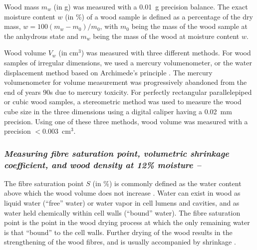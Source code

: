 \documentclass[a4paper, 12pt, leqno, dvipsnames]{article}\usepackage[]{graphicx}\usepackage[]{color}
\begin{document}
Wood mass $m_w$ (in g) was measured with a 0.01~g precision balance. The exact moisture content $w$ (in \%) of a wood sample is defined as a percentage of the dry mass, $w=100(m_w-m_0)/m_0$, with $m_0$ being the mass of the wood sample at the anhydrous state and $m_w$ being the mass of the wood at moisture content $w$. 

Wood volume $V_w$ (in cm$^3$) was measured with three different methods. For wood samples of irregular dimensions, we used a mercury volumenometer, or the water displacement method based on Archimede's principle \citep{Williamson2010}. The mercury volumenometer for volume measurement was progressively abandoned from the end of years 90s due to mercury toxicity. For perfectly rectangular parallelepiped or cubic wood samples, a stereometric method was used to measure the wood cube size in the three dimensions using a digital caliper having a 0.02~mm precision. Using one of these three methods, wood volume was measured with a precision $<$0.003~cm$^3$.

\subsubsection*{\textnormal{\textit{Measuring fibre saturation point, volumetric shrinkage coefficient, and wood density at 12\% moisture --}}}

The fibre saturation point $S$ (in \%) is commonly defined as the water content above which the wood volume does not increase \citep{Skaar1988}. Water can exist in wood as liquid water (``free'' water) or water vapor in cell lumens and cavities, and as water held chemically within cell walls (``bound'' water). The fibre saturation point is the point in the wood drying process at which the only remaining water is that ``bound'' to the cell walls. Further drying of the wood results in the strengthening of the wood fibres, and is usually accompanied by shrinkage \citep{Skaar1988}.
\end{document}
